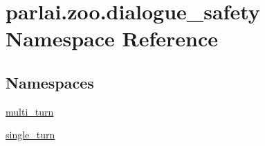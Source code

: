 \hypertarget{namespaceparlai_1_1zoo_1_1dialogue__safety}{}\section{parlai.\+zoo.\+dialogue\+\_\+safety Namespace Reference}
\label{namespaceparlai_1_1zoo_1_1dialogue__safety}
\subsection*{Namespaces}
\begin{DoxyCompactItemize}
\item 
 \hyperlink{namespaceparlai_1_1zoo_1_1dialogue__safety_1_1multi__turn}{multi\+\_\+turn}
\item 
 \hyperlink{namespaceparlai_1_1zoo_1_1dialogue__safety_1_1single__turn}{single\+\_\+turn}
\end{DoxyCompactItemize}
